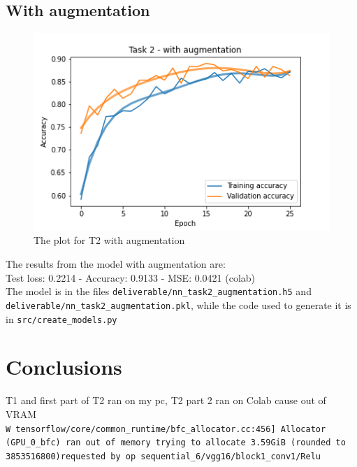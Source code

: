 \documentclass[11pt]{scrartcl}
\begin{document}
	\subsection*{With augmentation}

		\begin{figure}[H]
			\centering
			\includegraphics[width=\textwidth]{src/plot_task2_augmentation.png}
			\caption{The plot for T2 with augmentation}
			\label{fig:plot_T2_2}
		\end{figure}

		The results from the model with augmentation are:\\
		
		Test loss: 0.2214 - Accuracy: 0.9133 - MSE: 0.0421 (colab)\\

		The model is in the files \texttt{deliverable/nn\_task2\_augmentation.h5} and\\ 
		\texttt{deliverable/nn\_task2\_augmentation.pkl}, while the code used to generate 
		it is in \texttt{src/create\_models.py}


\section*{Conclusions}

	T1 and first part of T2 ran on my pc, T2 part 2 ran on Colab cause out of VRAM\\

	\texttt{W tensorflow/core/common\_runtime/bfc\_allocator.cc:456] Allocator (GPU\_0\_bfc) ran
	out of memory trying to allocate 3.59GiB (rounded to 3853516800)requested by op
	sequential\_6/vgg16/block1\_conv1/Relu}
\end{document}
